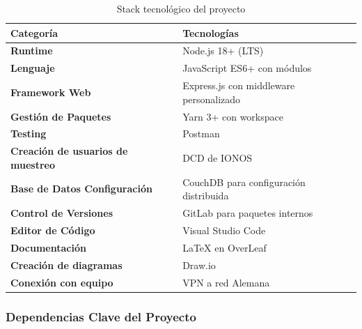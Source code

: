 \begin{table}[h!]
    \centering
    \begin{tabular}{|p{}|p{}|}
        \hline
        \textbf{Categoría}                         & \textbf{Tecnologías}                    \\
        \hline
        \hline
        \textbf{Runtime}                           & Node.js 18+ (LTS)                       \\
        \hline
        \textbf{Lenguaje}                          & JavaScript ES6+ con módulos             \\
        \hline
        \textbf{Framework Web}                     & Express.js con middleware personalizado \\
        \hline
        \textbf{Gestión de Paquetes}               & Yarn 3+ con workspace                   \\
        \hline
        \textbf{Testing}                           & Postman                                 \\
        \hline
        \textbf{Creación de usuarios de muestreo } & DCD de IONOS                            \\
        \hline
        \textbf{Base de Datos Configuración}       & CouchDB para configuración distribuida  \\
        \hline
        \textbf{Control de Versiones}              & GitLab para paquetes internos           \\
        \hline
        \textbf{Editor de Código}                  & Visual Studio Code                      \\
        \hline
        \textbf{Documentación}                     & LaTeX en OverLeaf                       \\
        \hline
        \textbf{Creación de diagramas}             & Draw.io                                 \\
        \hline
        \textbf{Conexión con equipo }              & VPN a red Alemana                       \\
        \hline
    \end{tabular}
    \caption{Stack tecnológico del proyecto}
    \label{tab:stack-tecnologico}
\end{table}

\subsubsection{Dependencias Clave del Proyecto}

